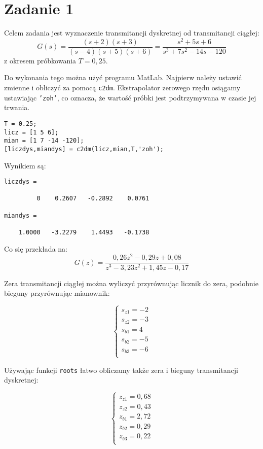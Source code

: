 \section{Zadanie 1}
Celem zadania jest wyznaczenie transmitancji dyskretnej od transmitancji ciągłej:
\[
 G(s)=\frac{(s + 2)(s + 3)}{(s - 4)(s + 5)(s + 6)}=\frac{s^2 + 5 s + 6}{s^3 + 7 s^2 - 14 s - 120}
\]
z okresem próbkowania $T=0,25$.

Do wykonania tego można użyć programu MatLab. Najpierw należy ustawić zmienne i obliczyć za pomocą \texttt{c2dm}.
Ekstrapolator zerowego rzędu osiągamy ustawiając \texttt{'zoh'}, co oznacza, że wartość próbki jest podtrzymywana w czasie jej trwania.
\begin{verbatim}
T = 0.25;
licz = [1 5 6];
mian = [1 7 -14 -120];
[liczdys,miandys] = c2dm(licz,mian,T,'zoh');
\end{verbatim}
Wynikiem są:
\begin{verbatim}
liczdys =

         0    0.2607   -0.2892    0.0761
         
miandys =

    1.0000   -3.2279    1.4493   -0.1738
\end{verbatim}

Co się przekłada na:
\[
 G(z)=\frac{0,26z^2 - 0,29z + 0,08}{z^3 - 3,23z^2 + 1,45z - 0,17}
\]

Zera transmitancji ciągłej można wyliczyć przyrównując licznik do zera, podobnie bieguny przyrównując mianownik:

\[
\left\{
\begin{array}{l}
	s_{z1}=-2	\\
	s_{z2}=-3	\\
	s_{b1}=4	\\
	s_{b2}=-5	\\
	s_{b3}=-6	\\
\end{array}
\right.
\]

Używając funkcji \texttt{roots} łatwo obliczamy także zera i bieguny transmitancji dyskretnej:

\[
\left\{
\begin{array}{l}
	z_{z1}=0,68	\\
	z_{z2}=0,43	\\
	z_{b1}=2,72	\\
	z_{b2}=0,29	\\
	z_{b3}=0,22	\\
\end{array}
\right.
\]
